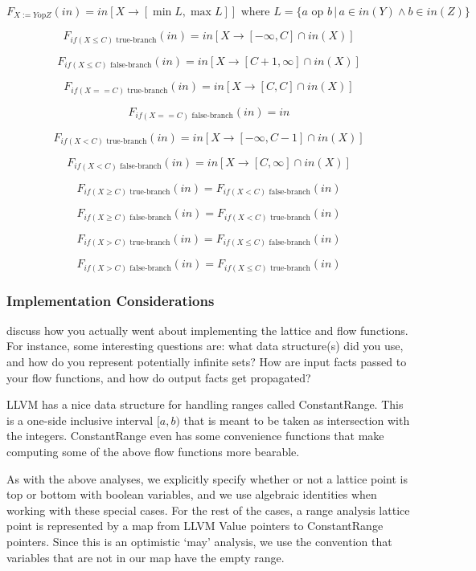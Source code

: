 \documentclass{article}
\theoremstyle{definition}
\begin{document}
\[ F_{X:= Y \text{op} Z}(in) = in[X \rightarrow [\min L, \max L]]\text{ where } L = \{ a \text{ op } b \, | \, a \in in(Y) \wedge b \in in(Z)  \}\]

\[ F_{if( X \leq C) \text{ true-branch}}(in) = in[X \rightarrow [-\infty, C] \cap in(X)  ] \]

\[ F_{if( X \leq C) \text{ false-branch}}(in) = in[X \rightarrow [C + 1, \infty] \cap in(X)  ]\]

\[ F_{if( X == C) \text{ true-branch}}(in) = in[X \rightarrow [C, C] \cap in(X)  ]\]

\[ F_{if( X == C) \text{ false-branch}}(in) = in \]

\[ F_{if( X < C) \text{ true-branch}}(in) =in[X \rightarrow [-\infty, C -1] \cap in(X)  ] \]

\[ F_{if( X < C) \text{ false-branch}}(in) =  in[X \rightarrow [C, \infty] \cap in(X)  ]\]

\[ F_{if( X \geq C) \text{ true-branch}}(in) =  F_{if( X < C) \text{ false-branch}}(in) \]

\[ F_{if( X \geq C) \text{ false-branch}}(in) =  F_{if( X < C) \text{ true-branch}}(in)\]

\[ F_{if( X > C) \text{ true-branch}}(in) =   F_{if( X \leq C) \text{ false-branch}}(in)\]

\[ F_{if( X > C) \text{ false-branch}}(in) =   F_{if( X \leq C) \text{ true-branch}}(in)\]


\subsubsection{Implementation Considerations}
\begin{framed}
  discuss how you actually went about implementing the lattice and
  flow functions. For instance, some interesting questions are: what
  data structure(s) did you use, and how do you represent potentially
  infinite sets? How are input facts passed to your flow functions,
  and how do output facts get propagated?
\end{framed}

LLVM has a nice data structure for handling ranges called ConstantRange. This is a one-side inclusive interval $[a, b)$ that is meant to be taken as intersection with the integers. ConstantRange even has some convenience functions that make computing some of the above flow functions more bearable. 

As with the above analyses, we explicitly specify whether or not a lattice point is top or bottom with boolean variables, and we use algebraic identities when working with these special cases. For the rest of the cases, a range analysis lattice point is represented by a map from LLVM Value pointers to ConstantRange pointers. Since this is an optimistic `may' analysis, we use the convention that variables that are {not} in our map have the empty range.  

 
\end{document}
